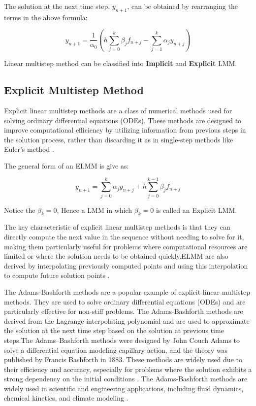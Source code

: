 The solution at the next time step, \(y_{n+1}\), can be obtained by rearranging the terms in the above formula:


\begin{equation}
  y_{n+1} = \frac{1}{\alpha_0} \left(h \sum_{j=0}^{k} \beta_j f_{n+j} - \sum_{j=1}^{k} \alpha_j y_{n+j}\right)
\end{equation}


Linear multistep method can be classified into \textbf{Implicit} and \textbf{Explicit} LMM.


\subsection{Explicit Multistep Method}
Explicit linear multistep methods are a class of numerical methods used for solving ordinary differential equations (ODEs). These methods are designed to improve computational efficiency by utilizing information from previous steps in the solution process, rather than discarding it as in single-step methods like Euler's method \cite{enwiki:1182900519}.

The general form of an ELMM is give as:

\begin{equation}
  y_{n+1} = \sum_{j=0}^{k} \alpha_j y_{n+j} + h \sum_{j=0}^{k-1} \beta_j f_{n+j}
\end{equation}

Notice the $\beta_k = 0$, Hence a LMM in which $\beta_k = 0$ is called an Explicit LMM.

The key characteristic of explicit linear multistep methods is that they can directly compute the next value in the sequence without needing to solve for it, making them particularly useful for problems where computational resources are limited or where the solution needs to be obtained quickly.ELMM are also derived by  interpolating previously computed points and using this interpolation to compute future solution points \cite{Alexanderian2022}.

The Adams-Bashforth methods are a popular example of explicit linear multistep methods. They are used to solve ordinary differential equations (ODEs) and are particularly effective for non-stiff problems. The Adams-Bashforth methods are derived from the Lagrange interpolating polynomial and are used to approximate the solution at the next time step based on the solution at previous time steps.The Adams–Bashforth methods were designed by John Couch Adams to solve a differential equation modeling capillary action, and the theory was published by Francis Bashforth in 1883. These methods are widely used due to their efficiency and accuracy, especially for problems where the solution exhibits a strong dependency on the initial conditions \cite{enwiki:1166346639}. The Adams-Bashforth methods are widely used in scientific and engineering applications, including fluid dynamics, chemical kinetics, and climate modeling \cite{wong2020lecture}.

